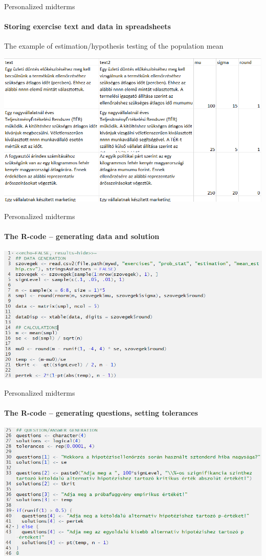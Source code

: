 \documentclass[10pt]{beamer}
\begin{document}
\begin{frame}{Personalized midterms}
\framesubtitle{Storing exercise text and data in spreadsheets}
The example of estimation/hypothesis testing of the population mean
\begin{center}
\includegraphics[width = \textwidth]{graph/excel.png}
\end{center}
\end{frame}

\begin{frame}{Personalized midterms}
\framesubtitle{The R-code -- generating data and solution}
\begin{center}
\includegraphics[width = \textwidth]{graph/R.png}
\end{center}
\end{frame}

\begin{frame}{Personalized midterms}
\framesubtitle{The R-code -- generating questions, setting tolerances}
\begin{center}
\includegraphics[width = \textwidth]{graph/R2.png}
\end{center}
\end{frame}
\end{document}
